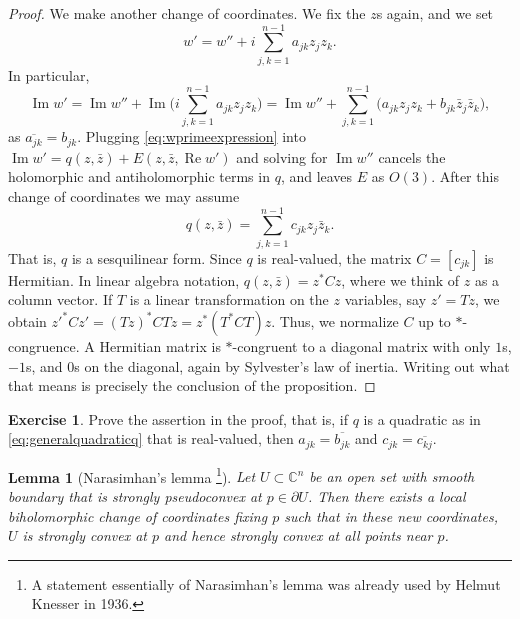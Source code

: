 \documentclass[12pt,openany]{book}
\renewcommand{\Re}{\operatorname{Re}}
\renewcommand{\Im}{\operatorname{Im}}
\newcommand{\C}{{\mathbb{C}}}
\theoremstyle{plain}
\newtheorem{lemma}[thm]{Lemma}
\theoremstyle{remark}
\theoremstyle{definition}
\newenvironment{exbox}{%
    \def\FrameCommand{\vrule width 1pt \relax\hspace{10pt}}%
    \MakeFramed {\advance \hsize -\width \FrameRestore}%
}{%
    \endMakeFramed
}
\theoremstyle{exercise}
\newtheorem{exercise}{Exercise}[section]
\theoremstyle{example}
\begin{document}
\begin{proof}
We make another change of coordinates.  We fix the $z$s again, and we set
\begin{equation} \label{eq:wprimeexpression}
w' = w'' + i
\sum_{j,k=1}^{n-1}
a_{jk} z_jz_k .
\end{equation}
In particular,
\begin{equation*}
\Im w'
= \Im w''
+ \Im \biggl(
i
\sum_{j,k=1}^{n-1}
a_{jk} z_jz_k 
\biggr)
=
\Im w''
+
\sum_{j,k=1}^{n-1}
\bigl(
a_{jk} z_jz_k 
+
b_{jk} \bar{z}_j\bar{z}_k 
\bigr) ,
\end{equation*}
as $\overline{a_{jk}} = b_{jk}$.  Plugging
\eqref{eq:wprimeexpression} into $\Im w' = q(z,\bar{z}) + E(z,\bar{z},\Re w')$
and solving for $\Im w''$ cancels the
holomorphic and antiholomorphic terms in $q$, and leaves $E$ as $O(3)$.
After this change of coordinates we may assume
\begin{equation*}
q(z,\bar{z}) = \sum_{j,k=1}^{n-1} c_{jk} z_j \bar{z}_k .
\end{equation*}
That is, $q$ is a sesquilinear form.  Since $q$ is real-valued, the matrix
$C = [ c_{jk} ]$ is Hermitian.  In linear algebra notation,
$q(z,\bar{z}) = z^*Cz$,
where %
we think of $z$ as a column vector.
If $T$ is a linear transformation on the $z$ variables, say $z'=Tz$, we
obtain ${z'}^*Cz' = {(Tz)}^*CTz = z^* ( T^*CT) z$.  Thus, we normalize $C$
up to $*$-congruence.  A Hermitian matrix
is $*$-congruent to a diagonal matrix with only $1$s, $-1$s, and $0$s on the
diagonal, again by Sylvester's law of inertia.  Writing out what that means is precisely the conclusion of the
proposition.
\end{proof}

\begin{exbox}
\begin{exercise}
Prove the assertion in the proof, that is, if $q$ is a quadratic as in
\eqref{eq:generalquadraticq} that is real-valued, then
 $a_{jk} = \overline{b_{jk}}$ and $c_{jk} = \overline{c_{kj}}$.
\pagebreak[3]
\end{exercise}
\end{exbox}

\begin{lemma}[Narasimhan's lemma%
\footnote{A statement essentially of Narasimhan's lemma was already used by Helmut
Knesser in 1936.}]
Let $U \subset \C^n$ be an open set with smooth boundary
that is strongly pseudoconvex at $p \in \partial U$.  Then there exists a local biholomorphic change of
coordinates fixing $p$ such that in these new coordinates, $U$ is strongly
convex at $p$ and hence strongly convex at all points near $p$.
\end{lemma}
\end{document}
